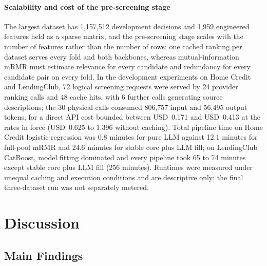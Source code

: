 \documentclass[final,5p,twocolumn]{elsarticle}
\begin{document}
\paragraph{Scalability and cost of the pre-screening stage}
The largest dataset has 1,157,512 development decisions and 1,959 engineered features held as a sparse matrix, and the pre-screening stage scales with the number of features rather than the number of rows: one cached ranking per dataset serves every fold and both backbones, whereas mutual-information mRMR must estimate relevance for every candidate and redundancy for every candidate pair on every fold. In the development experiments on Home Credit and LendingClub, 72 logical screening requests were served by 24 provider ranking calls and 48 cache hits, with 6 further calls generating source descriptions; the 30 physical calls consumed 806,757 input and 56,495 output tokens, for a direct API cost bounded between USD~0.171 and USD~0.413 at the rates in force (USD~0.625 to 1.396 without caching). Total pipeline time on Home Credit logistic regression was 0.8 minutes for pure LLM against 12.1 minutes for full-pool mRMR and 24.6 minutes for stable core plus LLM fill; on LendingClub CatBoost, model fitting dominated and every pipeline took 65 to 74 minutes except stable core plus LLM fill (256 minutes). Runtimes were measured under unequal caching and execution conditions and are descriptive only; the final three-dataset run was not separately metered.


\section{Discussion}
\label{sec:discussion}

\subsection{Main Findings}
\label{subsec:main_findings}
\end{document}
